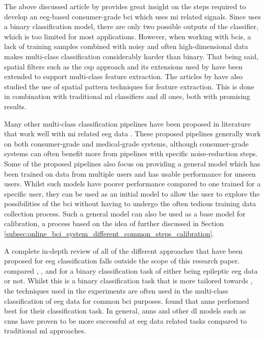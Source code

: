 The above discussed article by \citet{cheap_bci_feasibility} provides great insight on the steps required to develop an \gls{eeg}-based consumer-grade \gls{bci} which uses \gls{mi} related signals.
Since \citet{cheap_bci_feasibility} uses a binary classification model, there are only two possible outputs of the classifier, which is too limited for most applications.
However, when working with \glspl{bci}, a lack of training samples combined with noisy and often high-dimensional data makes multi-class classification considerably harder than binary.
That being said, spatial filters such as the \gls{csp} approach and its extensions used by \citet{cheap_bci_feasibility} have been extended to support multi-class feature extraction.
The articles by \citet{eeg_mi_model_lda_csp, eeg_mi_model_deep_cnn_spatial_filters} have also studied the use of spatial pattern techniques for feature extraction.
This is done in combination with traditional \gls{ml} classifiers and \gls{dl} ones, both with promising results.

Many other multi-class classification pipelines have been proposed in literature that work well with \gls{mi} related \gls{eeg} data \citep{fbcnet, eeg_mi_model_mussi, eeg_mi_model_lda_csp, eeg_mi_model_deep_cnn_spatial_filters, eeg_mi_model_image_based, eeg_model_fbcsp, eeg_model_hbm, eeg_model_esi, eeg_model_eegnet}.
These proposed pipelines generally work on both consumer-grade and medical-grade systems, although consumer-grade systems can often benefit more from pipelines with specific noise-reduction steps.
Some of the proposed pipelines also focus on providing a general model which has been trained on data from multiple users and has usable performance for unseen users.
Whilst such models have poorer performance compared to one trained for a specific user, they can be used as an initial model to allow the user to explore the possibilities of the \gls{bci} without having to undergo the often tedious training data collection process.
Such a general model can also be used as a base model for calibration, a process based on the idea of  further discussed in Section \ref{subsec:online_bci_system_different_common_steps_calibration}.

A complete in-depth review of all of the different approaches that have been proposed for \gls{eeg} classification falls outside the scope of this research paper.
 compared , ,  and  for a binary classification task of either being epileptic \gls{eeg} data or not.
Whilst this is a binary classification task that is more tailored towards , the techniques used in the experiments are often used in the multi-class classification of \gls{eeg} data for common \gls{bci} purposes.
 found that \glspl{ann} performed best for their classification task.
In general, \glspl{ann} and other \gls{dl} models such as \glspl{cnn} have proven to be more successful at \gls{eeg} data related tasks compared to traditional \gls{ml} approaches.

